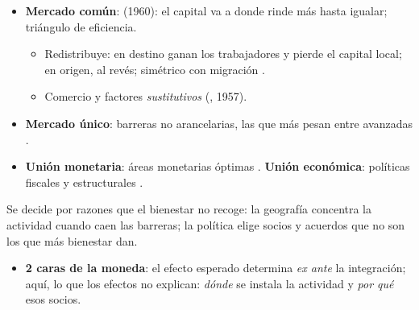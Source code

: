 \documentclass{article}
\begin{document}
\begin{columnas}
\begin{itemize}
\item \textbf{Mercado común}:  (1960): el capital va a donde rinde más hasta igualar; triángulo de eficiencia.
  \begin{itemize}
  \item Redistribuye: en destino ganan los trabajadores y pierde el capital local; en origen, al revés; simétrico con migración .
  \item Comercio y factores \emph{sustitutivos} (, 1957).
  \end{itemize}
\item \textbf{Mercado único}: barreras no arancelarias, las que más pesan entre avanzadas .
\item \textbf{Unión monetaria}: áreas monetarias óptimas . \textbf{Unión económica}: políticas fiscales y estructurales .
\end{itemize}

\begin{ideaclave}
Se decide por razones que el bienestar no recoge: la geografía concentra la actividad cuando caen las barreras; la política elige socios y acuerdos que no son los que más bienestar dan.
\end{ideaclave}
\begin{itemize}
\item \textbf{2 caras de la moneda}: el efecto esperado determina \emph{ex ante} la integración; aquí, lo que los efectos no explican: \emph{dónde} se instala la actividad y \emph{por qué} esos socios.
\end{itemize}


\end{columnas}
\end{document}
